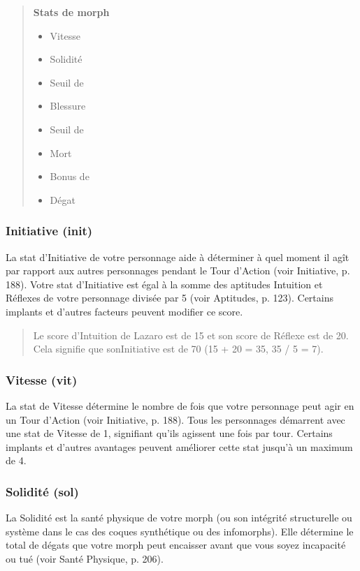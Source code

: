 \begin{quotation} \textbf{Stats de morph} \begin{itemize} \item Vitesse \item Solidité \item Seuil de \item Blessure \item Seuil de \item Mort \item Bonus de \item Dégat \end{itemize} \end{quotation} 

\subsubsection{Initiative (init)} \label{sec:initiative-init} 

La stat d'Initiative de votre personnage aide à déterminer à quel moment il agît par rapport aux autres personnages pendant le Tour d'Action (voir Initiative, p. 188). Votre stat d'Initiative est égal à la somme des aptitudes Intuition et Réflexes de votre personnage divisée par 5 (voir Aptitudes, p. 123). Certains implants et d'autres facteurs peuvent modifier ce score. 

\begin{quotation} Le score d'Intuition de Lazaro est de 15 et son score de Réflexe est de 20. Cela signifie que sonInitiative est de 70 (15 + 20 = 35, 35 / 5 = 7). \end{quotation} 

\subsubsection{Vitesse (vit)} \label{sec:speed-spd} 

La stat de Vitesse détermine le nombre de fois que votre personnage peut agir en un Tour d'Action (voir Initiative, p. 188). Tous les personnages démarrent avec une stat de Vitesse de 1, signifiant qu'ils agissent une fois par tour. Certains implants et d'autres avantages peuvent améliorer cette stat jusqu'à un maximum de 4. 

\subsubsection{Solidité (sol)} \label{sec:durability-dur} 

La Solidité est la santé physique de votre morph (ou son intégrité structurelle ou système dans le cas des coques synthétique ou des infomorphs). Elle détermine le total de dégats que votre morph peut encaisser avant que vous soyez incapacité ou tué (voir Santé Physique, p. 206). 

